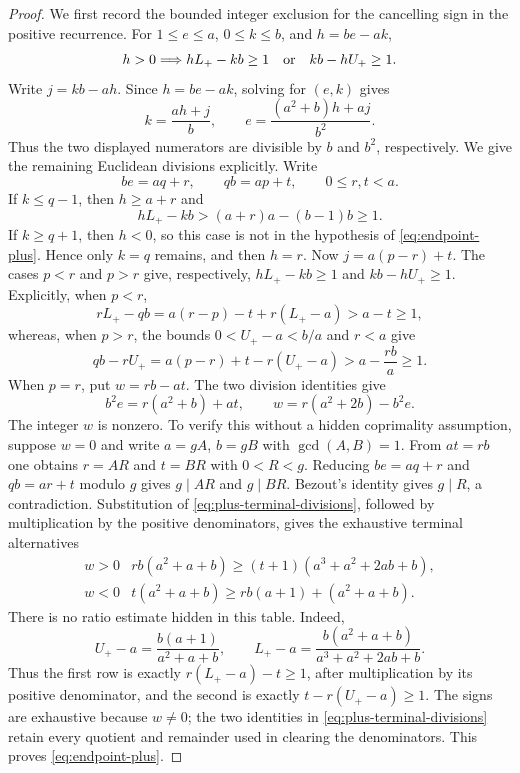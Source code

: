 \begin{proof}
We first record the bounded integer exclusion for the cancelling sign in the
positive recurrence.  For $1\le e\le a$, $0\le k\le b$, and $h=be-ak$,
\begin{equation}
h>0\Longrightarrow
  hL_+-kb\ge1\quad\hbox{or}\quad kb-hU_+\ge1.
\label{eq:endpoint-plus}
\end{equation}
Write $j=kb-ah$.  Since $h=be-ak$, solving for $(e,k)$ gives
\[
k=\frac{ah+j}{b},\qquad
e=\frac{(a^2+b)h+aj}{b^2}.
\]
Thus the two displayed numerators are divisible by $b$ and $b^2$,
respectively.  We give the remaining Euclidean divisions explicitly.  Write
\[
be=aq+r,\qquad qb=ap+t,\qquad 0\le r,t<a.
\]
If $k\le q-1$, then $h\ge a+r$ and
\[
hL_+-kb>(a+r)a-(b-1)b\ge1.
\]
If $k\ge q+1$, then $h<0$, so this case is not in the hypothesis of
\eqref{eq:endpoint-plus}.  Hence only $k=q$ remains, and then $h=r$.
Now $j=a(p-r)+t$.  The cases $p<r$ and $p>r$ give, respectively,
$hL_+-kb\ge1$ and $kb-hU_+\ge1$.  Explicitly, when $p<r$,
\[
rL_+-qb=a(r-p)-t+r(L_+-a)>a-t\ge1,
\]
whereas, when $p>r$, the bounds $0<U_+-a<b/a$ and $r<a$ give
\[
qb-rU_+=a(p-r)+t-r(U_+-a)>a-\frac{rb}{a}\ge1.
\]
When $p=r$, put $w=rb-at$.  The two division identities give
\begin{equation}
b^2e=r(a^2+b)+at,\qquad w=r(a^2+2b)-b^2e.
\label{eq:plus-terminal-divisions}
\end{equation}
The integer $w$ is nonzero.  To verify this without a hidden coprimality
assumption, suppose $w=0$ and write $a=gA$, $b=gB$ with
$\gcd(A,B)=1$.  From $at=rb$ one obtains $r=AR$ and $t=BR$ with
$0<R<g$.  Reducing $be=aq+r$ and $qb=ar+t$ modulo $g$ gives
$g\mid AR$ and $g\mid BR$.  Bezout's identity gives $g\mid R$, a
contradiction.  Substitution of
\eqref{eq:plus-terminal-divisions}, followed by multiplication by the positive
denominators, gives the exhaustive terminal alternatives
\[
\begin{array}{c|c}
w>0& rb(a^2+a+b)\ge(t+1)(a^3+a^2+2ab+b),\\
w<0& t(a^2+a+b)\ge rb(a+1)+(a^2+a+b).
\end{array}
\]
There is no ratio estimate hidden in this table.  Indeed,
\[
U_+-a=\frac{b(a+1)}{a^2+a+b},\qquad
L_+-a=\frac{b(a^2+a+b)}{a^3+a^2+2ab+b}.
\]
Thus the first row is exactly $r(L_+-a)-t\ge1$, after multiplication by
its positive denominator, and the second is exactly
$t-r(U_+-a)\ge1$.  The signs are exhaustive because $w\ne0$; the two
identities in \eqref{eq:plus-terminal-divisions} retain every quotient and
remainder used in clearing the denominators.  This proves
\eqref{eq:endpoint-plus}.


\end{proof}
